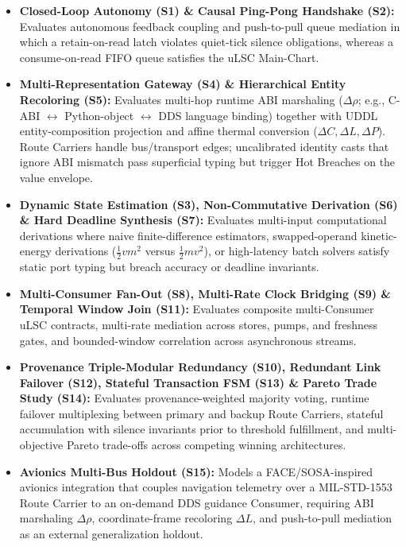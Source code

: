 \begin{itemize}[leftmargin=1.5em,itemsep=2pt]
  \item \textbf{Closed-Loop Autonomy (S1) \& Causal Ping-Pong Handshake (S2):}
        Evaluates autonomous feedback coupling and push-to-pull queue mediation in which a retain-on-read latch violates quiet-tick silence obligations, whereas a consume-on-read FIFO queue satisfies the uLSC Main-Chart.
  \item \textbf{Multi-Representation Gateway (S4) \& Hierarchical Entity Recoloring (S5):}
        Evaluates multi-hop runtime ABI marshaling ($\Delta\rho$; e.g., C-ABI $\leftrightarrow$ Python-object $\leftrightarrow$ DDS language binding) together with UDDL entity-composition projection and affine thermal conversion ($\Delta C, \Delta L, \Delta P$). Route Carriers handle bus/transport edges; uncalibrated identity casts that ignore ABI mismatch pass superficial typing but trigger Hot Breaches on the value envelope.
  \item \textbf{Dynamic State Estimation (S3), Non-Commutative Derivation (S6) \& Hard Deadline Synthesis (S7):}
        Evaluates multi-input computational derivations where naive finite-difference estimators, swapped-operand kinetic-energy derivations ($\frac{1}{2}v m^2$ versus $\frac{1}{2}m v^2$), or high-latency batch solvers satisfy static port typing but breach accuracy or deadline invariants.
  \item \textbf{Multi-Consumer Fan-Out (S8), Multi-Rate Clock Bridging (S9) \& Temporal Window Join (S11):}
        Evaluates composite multi-Consumer uLSC contracts, multi-rate mediation across stores, pumps, and freshness gates, and bounded-window correlation across asynchronous streams.
  \item \textbf{Provenance Triple-Modular Redundancy (S10), Redundant Link Failover (S12), Stateful Transaction FSM (S13) \& Pareto Trade Study (S14):}
        Evaluates provenance-weighted majority voting, runtime failover multiplexing between primary and backup Route Carriers, stateful accumulation with silence invariants prior to threshold fulfillment, and multi-objective Pareto trade-offs across competing winning architectures.
  \item \textbf{Avionics Multi-Bus Holdout (S15):}
        Models a FACE/SOSA-inspired avionics integration that couples navigation telemetry over a MIL-STD-1553 Route Carrier to an on-demand DDS guidance Consumer, requiring ABI marshaling $\Delta\rho$, coordinate-frame recoloring $\Delta L$, and push-to-pull mediation as an external generalization holdout.
\end{itemize}

